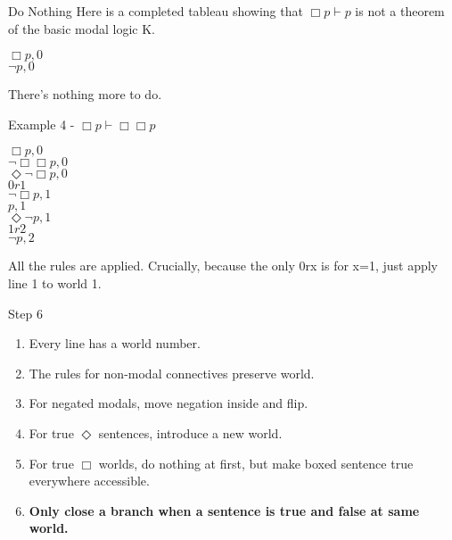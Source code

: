 \documentclass[
  14pt,
  letterpaper,
  ignorenonframetext,
  aspectratio=169,
]{beamer}
\providecommand{\tightlist}{%
  \setlength{\itemsep}{0pt}\setlength{\parskip}{0pt}}\usepackage{longtable,booktabs,array}
\begin{document}
\begin{frame}{Do Nothing}
\protect\hypertarget{do-nothing}{}
Here is a completed tableau showing that \(\Box p \vdash p\) is not a
theorem of the basic modal logic K.

\begin{center}
$\Box p, 0$ \\
$\neg p, 0$
\end{center}

There's nothing more to do.
\end{frame}

\begin{frame}{Example 4 - \(\Box p \vdash \Box \Box p\)}
\protect\hypertarget{example-4---box-p-vdash-box-box-p}{}
\begin{center}
$\Box p, 0$ \\
$\neg \Box \Box p, 0$ \\
$\Diamond \neg \Box p, 0$ \\
$0r1$ \\
$\neg \Box p, 1$ \\
$p, 1$ \\ 
$\Diamond \neg p, 1$ \\
$1r2$ \\
$\neg p, 2$
\end{center}

All the rules are applied. Crucially, because the only 0rx is for x=1,
just apply line 1 to world 1.
\end{frame}

\begin{frame}{Step 6}
\protect\hypertarget{step-6}{}
\begin{enumerate}
\tightlist
\item
  Every line has a world number.
\item
  The rules for non-modal connectives preserve world.
\item
  For negated modals, move negation inside and flip.
\item
  For true \(\Diamond\) sentences, introduce a new world.
\item
  For true \(\Box\) worlds, do nothing at first, but make boxed sentence
  true everywhere accessible.
\item
  \textbf{Only close a branch when a sentence is true and false at same
  world.}
\end{enumerate}
\end{frame}
\end{document}
